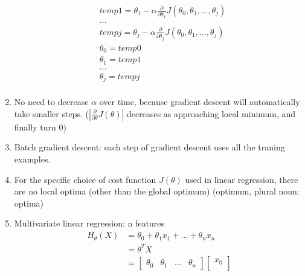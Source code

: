\documentclass[UTF8]{ctexart}
\begin{document}
\begin{enumerate}
\[\begin{aligned}
                   & temp1 = \theta_1 - \alpha \frac{\partial}{\partial\theta_1} J(\theta_0, \theta_1, \ldots, \theta_j) \\
                   & \ldots                                                                                              \\
                   & tempj = \theta_j - \alpha \frac{\partial}{\partial\theta_j} J(\theta_0, \theta_1, \ldots, \theta_j) \\
                   & \theta_0 = temp0                                                                                    \\
                   & \theta_1 = temp1                                                                                    \\
                   & \ldots                                                                                              \\
                   & \theta_j = tempj                                                                                    \\
              \end{aligned}
          \]
    \item No need to decrease $\alpha$ over time, because gradient descent will automatically take smaller steps. ($|\frac{\partial}{\partial\theta}J(\theta)|$ decreases as approaching local minimum, and finally turn $0$)
    \item Batch gradient descent: each step of gradient descent uses all the traning examples.
    \item For the specific choice of cost function $J(\theta)$ used in linear regression, there are no local optima (other than the global optimum) (optimum, plural noun: optima)
    \item Multivariate linear regression: n features
          \[
              \begin{aligned}
                  H_\theta(X) & = \theta_0 + \theta_1 x_1 + \ldots + \theta_n x_n \\
                              & = \theta^{T}X                                     \\
                              & =
                  \begin{bmatrix}
                      \theta_0 & \theta_1 & \ldots & \theta_n
                  \end{bmatrix}
                  \begin{bmatrix}
                      x_0    \\

\end{bmatrix}
\end{aligned}\]
\end{enumerate}
\end{document}

